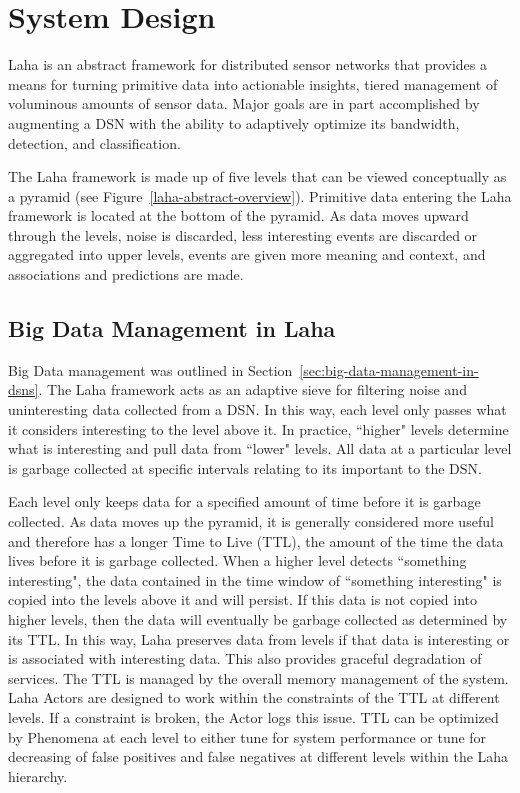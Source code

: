 
\chapter{System Design}\label{ch:system-design}
Laha is an abstract framework for distributed sensor networks that provides a means for turning primitive data into actionable insights, tiered management of voluminous amounts of sensor data. Major goals are in part accomplished by augmenting a DSN with the ability to adaptively optimize its bandwidth, detection, and classification.

The Laha framework is made up of five levels that can be viewed conceptually as a pyramid (see Figure~\ref{laha-abstract-overview}). Primitive data entering the Laha framework is located at the bottom of the pyramid. As data moves upward through the levels, noise is discarded, less interesting events are discarded or aggregated into upper levels, events are given more meaning and context, and associations and predictions are made.

\section{Big Data Management in Laha} \label{sec:big-data-management}
Big Data management was outlined in Section~\ref{sec:big-data-management-in-dsns}. The Laha framework acts as an adaptive sieve for filtering noise and uninteresting data collected from a DSN. In this way, each level only passes what it considers interesting to the level above it. In practice, ``higher" levels determine what is interesting and pull data from ``lower" levels. All data at a particular level is garbage collected at specific intervals relating to its important to the DSN\@.

Each level only keeps data for a specified amount of time before it is garbage collected. As data moves up the pyramid, it is generally considered more useful and therefore has a longer Time to Live (TTL), the amount of the time the data lives before it is garbage collected.  When a higher level detects ``something interesting", the data contained in the time window of ``something interesting" is copied into the levels above it and will persist. If this data is not copied into higher levels, then the data will eventually be garbage collected as determined by its TTL. In this way, Laha preserves data from levels if that data is interesting or is associated with interesting data. This also provides graceful degradation of services. The TTL is managed by the overall memory management of the system. Laha Actors are designed to work within the constraints of the TTL at different levels. If a constraint is broken, the Actor logs this issue. TTL can be optimized by Phenomena at each level to either tune for system performance or tune for decreasing of false positives and false negatives at different levels within the Laha hierarchy.

